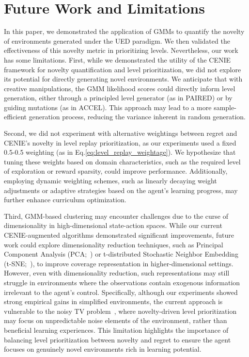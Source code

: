\section{Future Work and Limitations} \label{section:future_work_limitations}
In this paper, we demonstrated the application of GMMs to quantify the novelty of environments generated under the UED paradigm. We then validated the effectiveness of this novelty metric in prioritizing levels. Nevertheless, our work has some limitations. First, while we demonstrated the utility of the CENIE framework for novelty quantification and level prioritization, we did not explore its potential for directly generating novel environments. We anticipate that with creative manipulations, the GMM likelihood scores could directly inform level generation, either through a principled level generator (as in PAIRED) or by guiding mutations (as in ACCEL). This approach may lead to a more sample-efficient generation process, reducing the variance inherent in random generation.

Second, we did not experiment with alternative weightings between regret and CENIE’s novelty in level replay prioritization, as our experiments used a fixed 0.5-0.5 weighting (as in Eq.\ref{eq:level_replay_weightage}). We hypothesize that tuning these weights based on domain characteristics, such as the required level of exploration or reward sparsity, could improve performance. Additionally, employing dynamic weighting schemes, such as linearly decaying weight adjustments or adaptive strategies based on the agent’s learning progress, may further enhance curriculum optimization.

Third, GMM-based clustering may encounter challenges due to the curse of dimensionality in high-dimensional state-action spaces. While our current CENIE-augmented algorithms demonstrated significant improvements, future work could explore dimensionality reduction techniques, such as Principal Component Analysis (PCA;~\cite{pearson1901pca}) or t-distributed Stochastic Neighbor Embedding (t-SNE;~\cite{van2008visualizing}), to improve coverage representation in higher-dimensional settings. However, even with dimensionality reduction, such representations may still struggle in environments where the observations contain exogenous information irrelevant to the agent’s control. Specifically, although our experiments showed strong empirical gains in simplified environments, the current approach is vulnerable to the noisy TV problem~\cite{burda2018explorationrandom}, where novelty-driven level prioritization may focus on unpredictable noise elements of the environment, rather than beneficial learning experiences. This limitation highlights the importance of balancing level prioritization between novelty and regret to ensure the agent focuses on genuinely novel environments rich in learning potential. 

